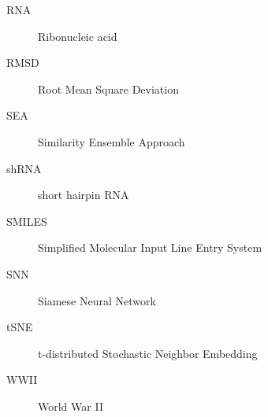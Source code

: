 \begin{description}
    \item[RNA] Ribonucleic acid
    \item[RMSD] Root Mean Square Deviation
    \item[SEA] Similarity Ensemble Approach
    \item[shRNA] short hairpin RNA
    \item[SMILES] Simplified Molecular Input Line Entry System
    \item[SNN] Siamese Neural Network
    \item[tSNE] t-distributed Stochastic Neighbor Embedding
    \item[WWII] World War II
\end{description}

